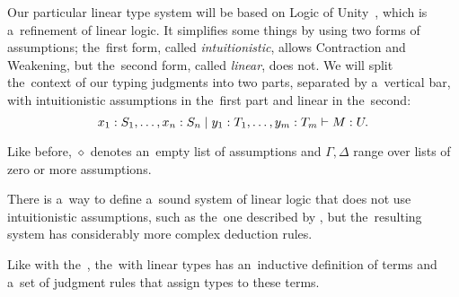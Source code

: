 
Our particular linear type system will be based on Logic of
Unity~\citep{girard_1993}, which is a~refinement of linear logic. It simplifies
some things by using two forms of assumptions; the~first form, called
\emph{intuitionistic}, allows Contraction and Weakening, but the~second form,
called \emph{linear}, does not. We will split the~context of our typing
judgments into two parts, separated by a~vertical bar, with intuitionistic
assumptions in the~first part and linear in the~second:
\[
  x_1 \overset{}: S_1, \dotsc, x_n \overset{}: S_n \mid y_1 \overset{}: T_1, \dotsc, y_m \overset{}: T_m
    \vdash M \overset{}: U.
\]

Like before, $\diamond$ denotes an~empty list of assumptions and $\Gamma,
\Delta$ range over lists of zero or more assumptions.

There is a~way to define a~sound system of linear logic that does not use
intuitionistic assumptions, such as the~one described by
\citet{benton_et_al_1993}, but the~resulting system has considerably more
complex deduction rules.

Like with the~, the~\lc with linear types has an~inductive
definition of terms and a~set of judgment rules that assign types to these
terms.

